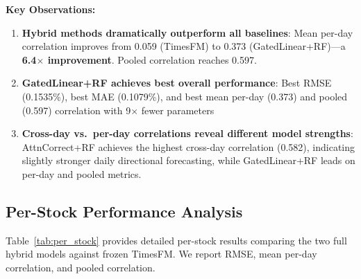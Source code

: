 \documentclass[10pt,conference]{IEEEtran}
\newcommand{\rev}[1]{#1}
\begin{document}
\textbf{Key Observations:}

\begin{enumerate}
    \item \textbf{Hybrid methods dramatically outperform all baselines}: \rev{Mean per-day correlation improves from 0.059 (TimesFM) to 0.373 (GatedLinear+RF)---a \textbf{6.4$\times$ improvement}. Pooled correlation reaches 0.597.}
    \item \textbf{GatedLinear+RF achieves best overall performance}: Best RMSE (\rev{0.1535}\%), best MAE (\rev{0.1079}\%), and \rev{best mean per-day (0.373) and pooled (0.597) correlation} with 9$\times$ fewer parameters
    \item \rev{\textbf{Cross-day vs.\ per-day correlations reveal different model strengths}: AttnCorrect+RF achieves the highest cross-day correlation (0.582), indicating slightly stronger daily directional forecasting, while GatedLinear+RF leads on per-day and pooled metrics.}
\end{enumerate}

\subsection{Per-Stock Performance Analysis}

Table~\ref{tab:per_stock} provides detailed per-stock results comparing the two full hybrid models against frozen TimesFM. \rev{We report RMSE, mean per-day correlation, and pooled correlation.}
\end{document}
